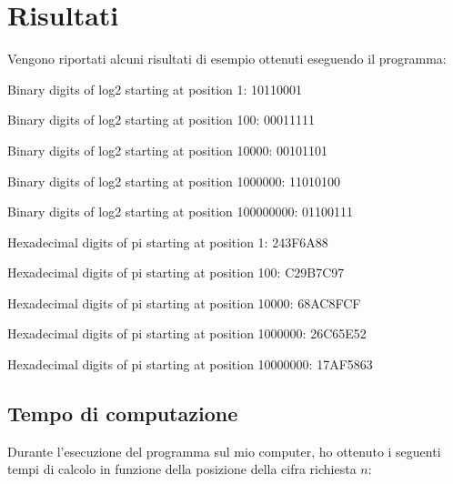 \section{Risultati}
Vengono riportati alcuni risultati di esempio ottenuti eseguendo il programma:
\newline

Binary digits of log2 starting at position 1: 10110001

Binary digits of log2 starting at position 100: 00011111

Binary digits of log2 starting at position 10000: 00101101

Binary digits of log2 starting at position 1000000: 11010100

Binary digits of log2 starting at position 100000000: 01100111
\newline

Hexadecimal digits of pi starting at position 1: 243F6A88

Hexadecimal digits of pi starting at position 100: C29B7C97

Hexadecimal digits of pi starting at position 10000: 68AC8FCF

Hexadecimal digits of pi starting at position 1000000: 26C65E52

Hexadecimal digits of pi starting at position 10000000: 17AF5863

\subsection{Tempo di computazione}
Durante l'esecuzione del programma sul mio computer, ho ottenuto i seguenti tempi di calcolo in funzione della posizione della cifra richiesta $n$:


